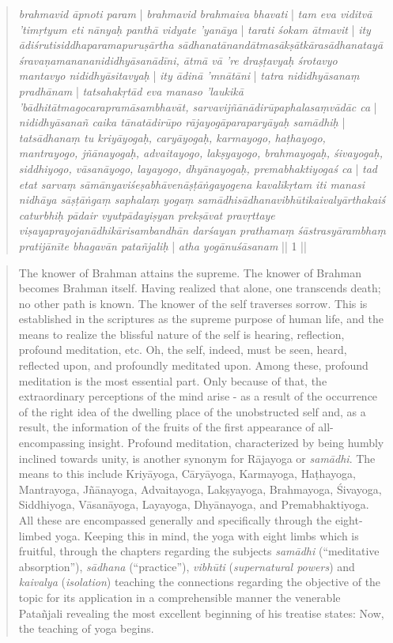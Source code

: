 \begin{quote}
\textit{brahmavid āpnoti param} | \textit{brahmavid brahmaiva bhavati} | \textit{tam eva viditvā 'timṛtyum eti nānyaḥ panthā vidyate 'yanāya} | \textit{tarati śokam ātmavit} | \textit{ity ādiśrutisiddhaparamapuruṣārtha sādhanatānandātmasākṣātkārasādhanatayā śravaṇamanananididhyāsanādīni, ātmā vā 're draṣṭavyaḥ śrotavyo mantavyo nididhyāsitavyaḥ} | \textit{ity ādinā 'mnātāni} | \textit{tatra nididhyāsanaṃ pradhānam} | \textit{tatsahakṛtād eva manaso 'laukikā 'bādhitātmagocarapramāsambhavāt, sarvavijñānādirūpaphalasaṃvādāc ca} | \textit{nididhyāsanañ caika tānatādirūpo rājayogāparaparyāyaḥ samādhiḥ} | \textit{tatsādhanaṃ tu kriyāyogaḥ, caryāyogaḥ, karmayogo, haṭhayogo, mantrayogo, jñānayogaḥ, advaitayogo, lakṣyayogo, brahmayogaḥ, śivayogaḥ, siddhiyogo, vāsanāyogo, layayogo, dhyānayogaḥ, premabhaktiyogaś ca} | \textit{tad etat sarvaṃ sāmānyaviśeṣabhāvenāṣṭāṅgayogena kavalīkṛtam iti manasi nidhāya sāṣṭāṅgaṃ saphalaṃ yogaṃ samādhisādhanavibhūtikaivalyārthakaiś caturbhiḥ pādair vyutpādayiṣyan prekṣāvat pravṛttaye viṣayaprayojanādhikārisambandhān darśayan prathamaṃ śāstrasyārambhaṃ pratijānīte bhagavān patañjaliḥ} | \textit{atha yogānuśāsanam} || 1 ||
  
\end{quote}
\begin{quote}
  The knower of Brahman attains the supreme. The knower of Brahman becomes Brahman itself. Having realized that alone, one transcends death; no other path is known. The knower of the self traverses sorrow. This is established in the scriptures as the supreme purpose of human life, and the means to realize the blissful nature of the self is hearing, reflection, profound meditation, etc. Oh, the self, indeed, must be seen, heard, reflected upon, and profoundly meditated upon. Among these, profound meditation is the most essential part. Only because of that, the extraordinary perceptions of the mind arise - as a result of the occurrence of the right idea of the dwelling place of the unobstructed self and, as a result, the information of the fruits of the first appearance of all-encompassing insight. Profound meditation, characterized by being humbly inclined towards unity, is another synonym for Rājayoga or \textit{samādhi}. The means to this include Kriyāyoga, Cāryāyoga, Karmayoga, Haṭhayoga, Mantrayoga, Jñānayoga, Advaitayoga, Lakṣyayoga, Brahmayoga, Śivayoga, Siddhiyoga, Vāsanāyoga, Layayoga, Dhyānayoga, and Premabhaktiyoga. All these are encompassed generally and specifically through the eight-limbed yoga. Keeping this in mind, the yoga with eight limbs which is fruitful, through the chapters regarding the subjects \textit{samādhi} (``meditative absorption''), \textit{sādhana} (``practice''), \textit{vibhūti} (\textit{supernatural powers}) and \textit{kaivalya} (\textit{isolation}) teaching the connections regarding the objective of the topic for its application in a comprehensible manner the venerable Patañjali revealing the most excellent beginning of his treatise states: Now, the teaching of yoga begins.
  \end{quote}

